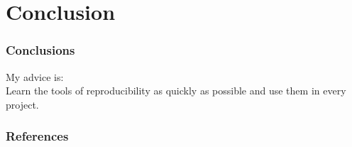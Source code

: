 \documentclass{beamer}
\begin{document}
\section{Conclusion}

\begin{frame}
\frametitle{Conclusions}

\begin{center}\Huge{\sc My advice is:}\\ \vspace{20pt}
    \Large Learn the tools of reproducibility as quickly as possible and use them in every project.\end{center}
\end{frame}


\begin{frame}
\frametitle{References}
\fontsize{6}{7.2}\selectfont


\end{frame}
\end{document}
